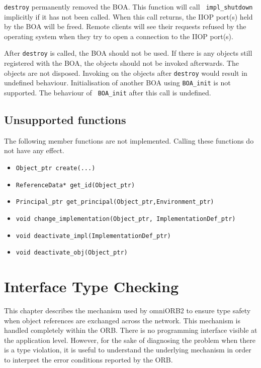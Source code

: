 \documentclass[11pt,twoside,onecolumn]{book}
\begin{document}
{\tt destroy} permanently removed the BOA. This function will call {\tt
impl\_shutdown} implicitly if it has not been called. When this call
returns, the IIOP port(s) held by the BOA will be freed. Remote clients
will see their requests refused by the operating system when they try to
open a connection to the IIOP port(s). 

After {\tt destroy} is called, the BOA should not be used. If there is any
objects still registered with the BOA, the objects should not be invoked
afterwards. The objects are not disposed. Invoking on the objects after
{\tt destroy} would result in undefined behaviour. Initialisation of
another BOA using {\tt BOA\_init} is not supported. The behaviour of {\tt
BOA\_init} after this call is undefined.

\section{Unsupported functions}

The following member functions are not implemented. Calling these functions
do not have any effect.

\begin{itemize}
\item {\tt Object\_ptr create(...)}
\item {\tt ReferenceData* get\_id(Object\_ptr)}
\item {\tt Principal\_ptr get\_principal(Object\_ptr,Environment\_ptr)}
\item {\tt void change\_implementation(Object\_ptr, ImplementationDef\_ptr)}
\item {\tt void deactivate\_impl(ImplementationDef\_ptr)}
\item {\tt void deactivate\_obj(Object\_ptr)}
\end{itemize}


\chapter{Interface Type Checking}
\label{ch_intf}

This chapter describes the mechanism used by omniORB2 to ensure type safety
when object references are exchanged across the network. This mechanism is
handled completely within the ORB. There is no programming interface
visible at the application level. However, for the sake of diagnosing the
problem when there is a type violation, it is useful to understand the
underlying mechanism in order to interpret the error conditions reported by
the ORB.
\end{document}
